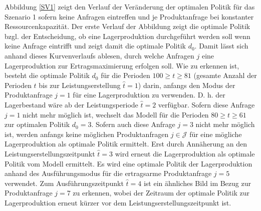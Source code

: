 Abbildung \ref{SV1} zeigt den Verlauf der Veränderung der optimalen Politik für das Szenario 1 sofern keine Anfragen eintreffen und je Produktanfrage bei konstanter Ressourcenkapazität. Der erste Verlauf der Abbildung zeigt die optimale Politik bzgl. der Entscheidung, ob eine Lagerproduktion durchgeführt werden soll wenn keine Anfrage eintrifft und zeigt damit die optimale Politik $d_0$. Damit lässt sich anhand dieses Kurvenverlaufs ablesen, durch welche Anfragen $j$ eine Lagerproduktion zur Ertragsmaximierung erfolgen soll. Wie zu erkennen ist, besteht die optimale Politik $d_0$ für die Perioden $100\ge t \ge 81$ (gesamte Anzahl der Perioden $t$ bis zur Leistungserstellung $\hat t = 1$) darin, anfangs den Modus der Produktanfrage $j=1$ für eine Lagerproduktion zu verwenden. D. h. der Lagerbestand wäre ab der Leistungsperiode $\hat t=2$ verfügbar. Sofern diese Anfrage $j=1$ nicht mehr möglich ist, wechselt das Modell für die Perioden $80\ge t \ge 61$ zur optimalen Politik $d_0=3$. Sofern auch diese Anfrage $j=3$ nicht mehr möglich ist, werden anfangs keine möglichen Produktanfragen $j\in\mathcal{J}$ für eine mögliche Lagerproduktion als optimale Politik ermittelt. Erst durch Annäherung an den Leistungserstellungszeitpunkt $\hat t = 3$ wird erneut die Lagerproduktion als optimale Politik vom Modell ermittelt. Es wird eine optimale Politik der Lagerproduktion anhand des Ausführungsmodus für die ertragsarme Produktanfrage $j=5$ verwendet. Zum Ausführungszeitpunkt $\hat t = 4$ ist ein ähnliches Bild im Bezug zur Produktanfrage $j=7$ zu erkennen, wobei der Zeitraum der optimale Politik zur Lagerproduktion erneut kürzer vor dem Leistungserstellungszeitpunkt ist.

